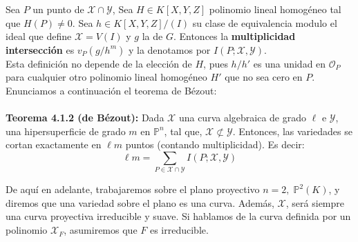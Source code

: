 \documentclass[11pt,spanish]{book}
\begin{document}
Sea $P$ un punto de $\mathbf{\mathcal{X}}\cap\mathbf{\mathcal{Y}}$, Sea $H\in K[X,Y,Z]$ polinomio lineal homogéneo tal que $H(P)\neq 0$. Sea $h\in K[X,Y,Z]/(I)$ su clase de equivalencia modulo el ideal que define $\mathbf{\mathcal{X}}=V(I)$ y $g$ la de $G$. Entonces la \textbf{multiplicidad intersección} es $v_P(g/h^{m})$ y la denotamos por $I(P;\mathbf{\mathcal{X}},\mathbf{\mathcal{Y}})$. \\

Esta definición no depende de la elección de $H$, pues $h/h'$ es una unidad en $\mathcal{O}_P$ para cualquier otro polinomio lineal homogéneo $H'$ que no sea cero en $P$.\\

Enunciamos a continuación el teorema de Bézout:\\
\\ \hypertarget{Bézout}{\textbf{Teorema 4.1.2 (de Bézout): }} Dada $\mathbf{\mathcal{X}}$ una curva algebraica de grado $\ell$ e $\mathbf{\mathcal{Y}}$, una hipersuperficie de grado $m$ en $\mathbb{P}^n$, tal que, $\mathbf{\mathcal{X}}\not\subset\mathbf{\mathcal{Y}}$. Entonces, las variedades se cortan exactamente en $\ell m$ puntos (contando multiplicidad). Es decir:\\
$$\ell m=\sum_{P\in \mathbf{\mathcal{X}}\cap \mathbf{\mathcal{Y}}} I(P;\mathbf{\mathcal{X}},\mathbf{\mathcal{Y}})$$

De aquí en adelante, trabajaremos sobre el plano proyectivo $n=2,\;\mathbb{P}^{2}(K)$, y diremos que una variedad sobre el plano es una curva. Además, $\mathbf{\mathcal{X}}$, será siempre una curva proyectiva irreducible y suave. Si hablamos de la curva definida por un polinomio $\mathbf{\mathcal{X}}_F$, asumiremos que $F$ es irreducible.\\
\
\end{document}
